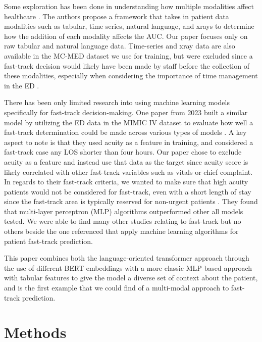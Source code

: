\documentclass[sigconf]{acmart}
\begin{document}
Some exploration has been done in understanding how multiple modalities affect healthcare \cite{soenksen2022integrated}. The authors propose a framework that takes in patient data modalities such as tabular, time series, natural language, and xrays to determine how the addition of each modality affects the AUC. Our paper focuses only on raw tabular and natural language data. Time-series and xray data are also available in the MC-MED dataset we use for training, but were excluded since a fast-track decision would likely have been made by staff before the collection of these modalities, especially when considering the importance of time management in the ED \cite{Mostafa2024}.

There has been only limited research into using machine learning models specifically for fast-track decision-making. One paper from 2023 built a similar model by utilizing the ED data in the MIMIC IV dataset to evaluate how well a fast-track determination could be made across various types of models \cite{karajeh2023classifying}. A key aspect to note is that they used acuity as a feature in training, and considered a fast-track case any LOS shorter than four hours. Our paper chose to exclude acuity as a feature and instead use that data as the target since acuity score is likely correlated with other fast-track variables such as vitals or chief complaint. In regards to their fast-track criteria, we wanted to make sure that high acuity patients would not be considered for fast-track, even with a short length of stay since the fast-track area is typically reserved for non-urgent patients \cite{Quattrini2011}. They found that multi-layer perceptron (MLP) algorithms outperformed other all models tested. We were able to find many other studies relating to fast-track \cite{La2013,Quattrini2011,Chrusciele026200,Nash2007, gasperini2020fasttrack} but no others beside the one referenced that apply machine learning algorithms for patient fast-track prediction.

This paper combines both the language-oriented transformer approach through the use of different BERT embeddings with a more classic MLP-based approach with tabular features to give the model a diverse set of context about the patient, and is the first example that we could find of a multi-modal approach to fast-track prediction.
\section{Methods}
\end{document}

